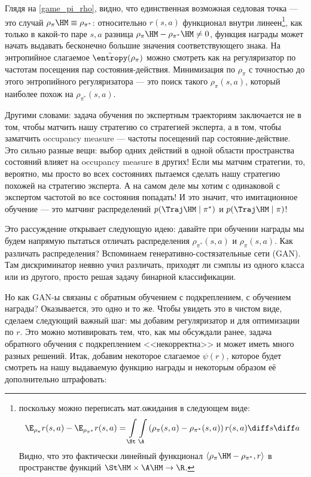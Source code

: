Глядя на \eqref{game_pi_rho}, видно, что единственная возможная седловая точка --- это случай $\rho_{\pi} \HM\equiv \rho_{\pi^*}$: относительно $r(s, a)$ функционал внутри линеен\footnote{поскольку можно переписать мат.ожидания в следующем виде:
$$\E_{\rho_{\pi}} r(s, a) - \E_{\rho_{\pi^*}} r(s, a) = \int\limits_{\St} \int\limits_{\A} \left(\rho_{\pi}(s, a) - \rho_{\pi^*}(s, a)\right) r(s, a) \diff s \diff a$$
Видно, что это фактически линейный функционал $\langle \rho_{\pi} \HM- \rho_{\pi^*},  r\rangle$ в пространстве функций $\St \HM\times \A \HM\to \R$.}, как только в какой-то паре $s, a$ разница $\rho_{\pi} \HM - \rho_{\pi^*} \HM\neq 0$, функция награды может начать выдавать бесконечно большие значения соответствующего знака. На энтропийное слагаемое $\tilde{\entropy}(\rho_\pi)$ можно смотреть как на регуляризатор по частотам посещения пар состояния-действия. Минимизация по $\rho_\pi$ с точностью до этого энтропийного регуляризатора --- это поиск такого $\rho_\pi(s, a)$, который наиболее похож на $\rho_{\pi^*}(s, a)$.

Другими словами: задача обучения по экспертным траекториям заключается не в том, чтобы матчить нашу стратегию со стратегией эксперта, а в том, чтобы заматчить occupancy measure --- частоты посещений пар состояние-действие. Это сильно разные вещи: выбор одних действий в одной области пространства состояний влияет на occupancy measure в других! Если мы матчим стратегии, то, вероятно, мы просто во всех состояниях пытаемся сделать нашу стратегию похожей на стратегию эксперта. А на самом деле мы хотим с одинаковой с экспертом частотой во все состояния попадать! И это значит, что имитационное обучение --- это матчинг распределений $p(\Traj \HM\mid \pi^*)$ и $p(\Traj \HM\mid \pi)$!

Это рассуждение открывает следующую идею: давайте при обучении награды мы будем напрямую пытаться отличать распределения $\rho_{\pi^*}(s, a)$ и $\rho_{\pi}(s, a)$. Как различать распределения? Вспоминаем генеративно-состязательные сети (GAN). Там дискриминатор неявно учил различать, приходят ли сэмплы из одного класса или из другого, просто решая задачу бинарной классификации.

Но как GAN-ы связаны с обратным обучением с подкреплением, с обучением награды? Оказывается, это одно и то же. Чтобы увидеть это в чистом виде, сделаем следующий важный шаг: мы добавим регуляризатор и для оптимизации по $r$. Это можно мотивировать тем, что, как мы обсуждали ранее, задача обратного обучения с подкреплением <<некорректна>> и может иметь много разных решений. Итак, добавим некоторое слагаемое $\psi(r)$, которое будет смотреть на нашу выдаваемую функцию награды и некоторым образом её дополнительно штрафовать:

